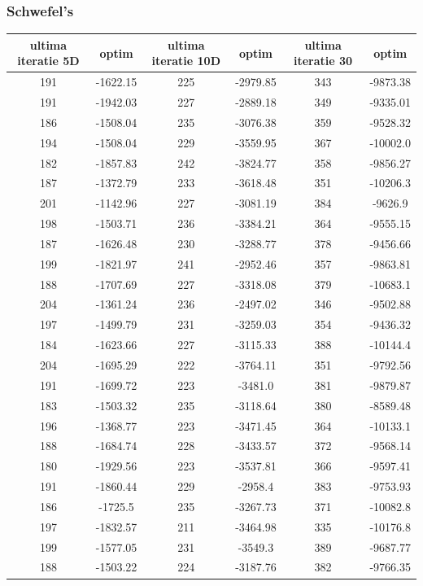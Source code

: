 \documentclass{article}
\begin{document}
\subsubsection{Schwefel’s}
\begin{tabular}{cccccc}
\hline
ultima iteratie 5D& optim&ultima iteratie 10D& optim&ultima iteratie 30&optim\\
\hline
191&-1622.15&225&-2979.85&343&-9873.38 \\ \hline
191&-1942.03&227&-2889.18&349&-9335.01 \\ \hline
186&-1508.04&235&-3076.38&359&-9528.32 \\ \hline
194&-1508.04&229&-3559.95&367&-10002.0 \\ \hline
182&-1857.83&242&-3824.77&358&-9856.27 \\ \hline
187&-1372.79&233&-3618.48&351&-10206.3 \\ \hline
201&-1142.96&227&-3081.19&384&-9626.9 \\ \hline
198&-1503.71&236&-3384.21&364&-9555.15 \\ \hline
187&-1626.48&230&-3288.77&378&-9456.66 \\ \hline
199&-1821.97&241&-2952.46&357&-9863.81 \\ \hline
188&-1707.69&227&-3318.08&379&-10683.1 \\ \hline
204&-1361.24&236&-2497.02&346&-9502.88 \\ \hline
197&-1499.79&231&-3259.03&354&-9436.32 \\ \hline
184&-1623.66&227&-3115.33&388&-10144.4 \\ \hline
204&-1695.29&222&-3764.11&351&-9792.56 \\ \hline
191&-1699.72&223&-3481.0&381&-9879.87 \\ \hline
183&-1503.32&235&-3118.64&380&-8589.48 \\ \hline
196&-1368.77&223&-3471.45&364&-10133.1 \\ \hline
188&-1684.74&228&-3433.57&372&-9568.14 \\ \hline
180&-1929.56&223&-3537.81&366&-9597.41 \\ \hline
191&-1860.44&229&-2958.4&383&-9753.93 \\ \hline
186&-1725.5&235&-3267.73&371&-10082.8 \\ \hline
197&-1832.57&211&-3464.98&335&-10176.8 \\ \hline
199&-1577.05&231&-3549.3&389&-9687.77 \\ \hline
188&-1503.22&224&-3187.76&382&-9766.35 \\ \hline

\end{tabular}
\end{document}
